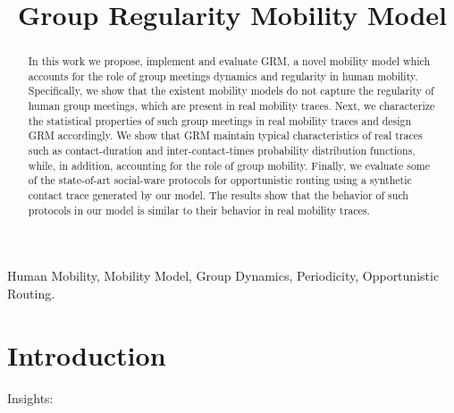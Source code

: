 \documentclass[10pt, conference, letterpaper]{IEEEtran}
\begin{document}
\title{Group Regularity Mobility Model}

\author{
}

\maketitle


\begin{abstract}
In this work we propose, implement and evaluate GRM, a novel mobility model which accounts for the role of group meetings dynamics and regularity in human mobility. Specifically, we show that the existent mobility models do not capture the regularity of human group meetings, which are present in real mobility traces. Next, we characterize the statistical properties of such group meetings in real mobility traces and design GRM accordingly. We show that GRM maintain typical characteristics of real traces such as contact-duration and inter-contact-times probability distribution functions, while, in  addition, accounting for the role of group mobility. Finally, we evaluate some of the state-of-art social-ware protocols for opportunistic routing using a synthetic contact trace generated by our model. The results show that the behavior of such protocols in our model is similar to their behavior in real mobility traces.
\end{abstract}

\begin{IEEEkeywords}
Human Mobility, Mobility Model, Group Dynamics, Periodicity, Opportunistic Routing.
\end{IEEEkeywords}

\IEEEpeerreviewmaketitle

\tableofcontents

\section{Introduction}

Insights:
\end{document}
